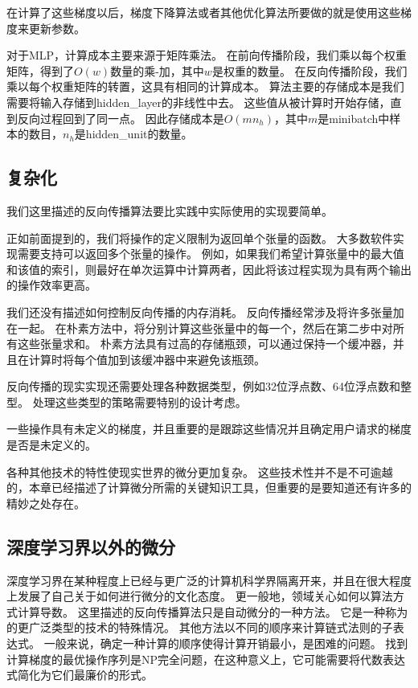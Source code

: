 在计算了这些梯度以后，梯度下降算法或者其他优化算法所要做的就是使用这些梯度来更新参数。

对于MLP，计算成本主要来源于矩阵乘法。
在前向传播阶段，我们乘以每个权重矩阵，得到了$O(w)$数量的乘-加，其中$w$是权重的数量。
在反向传播阶段，我们乘以每个权重矩阵的转置，这具有相同的计算成本。
算法主要的存储成本是我们需要将输入存储到\gls{hidden_layer}的非线性中去。
这些值从被计算时开始存储，直到反向过程回到了同一点。
因此存储成本是$O(mn_h)$，其中$m$是\gls{minibatch}中样本的数目，$n_h$是\gls{hidden_unit}的数量。
  
  
\subsection{复杂化}
\label{sec:complications}

我们这里描述的反向传播算法要比实践中实际使用的实现要简单。

正如前面提到的，我们将操作的定义限制为返回单个张量的函数。
大多数软件实现需要支持可以返回多个张量的操作。 
例如，如果我们希望计算张量中的最大值和该值的索引，则最好在单次运算中计算两者，因此将该过程实现为具有两个输出的操作效率更高。

我们还没有描述如何控制反向传播的内存消耗。
反向传播经常涉及将许多张量加在一起。
在朴素方法中，将分别计算这些张量中的每一个，然后在第二步中对所有这些张量求和。 
朴素方法具有过高的存储瓶颈，可以通过保持一个缓冲器，并且在计算时将每个值加到该缓冲器中来避免该瓶颈。

反向传播的现实实现还需要处理各种数据类型，例如32位浮点数、64位浮点数和整型。
处理这些类型的策略需要特别的设计考虑。

一些操作具有未定义的梯度，并且重要的是跟踪这些情况并且确定用户请求的梯度是否是未定义的。

各种其他技术的特性使现实世界的微分更加复杂。 这些技术性并不是不可逾越的，本章已经描述了计算微分所需的关键知识工具，但重要的是要知道还有许多的精妙之处存在。
  
  
\subsection{深度学习界以外的微分}
\label{sec:differentiation_outside_the_deep_learning_community}

深度学习界在某种程度上已经与更广泛的计算机科学界隔离开来，并且在很大程度上发展了自己关于如何进行微分的文化态度。
更一般地，领域关心如何以算法方式计算导数。 
这里描述的反向传播算法只是自动微分的一种方法。 
它是一种称为的更广泛类型的技术的特殊情况。 
其他方法以不同的顺序来计算链式法则的子表达式。 
一般来说，确定一种计算的顺序使得计算开销最小，是困难的问题。 
找到计算梯度的最优操作序列是NP完全问题\citep{naumann2008optimal}，在这种意义上，它可能需要将代数表达式简化为它们最廉价的形式。

